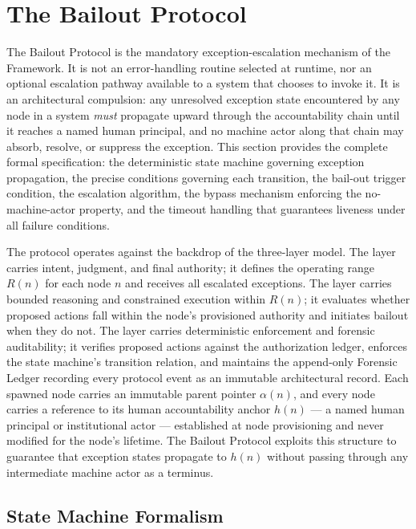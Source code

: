\section{The Bailout Protocol}\label{sec:bailout}

The Bailout Protocol is the mandatory exception-escalation mechanism of the \bxthree{} Framework. It is not an error-handling routine selected at runtime, nor an optional escalation pathway available to a system that chooses to invoke it. It is an architectural compulsion: any unresolved exception state encountered by any node in a \bxthree{} system \emph{must} propagate upward through the accountability chain until it reaches a named human principal, and no machine actor along that chain may absorb, resolve, or suppress the exception. This section provides the complete formal specification: the deterministic state machine governing exception propagation, the precise conditions governing each transition, the bail-out trigger condition, the escalation algorithm, the bypass mechanism enforcing the no-machine-actor property, and the timeout handling that guarantees liveness under all failure conditions.

The protocol operates against the backdrop of the \bxthree{} three-layer model. The \purpose{} layer carries intent, judgment, and final authority; it defines the operating range $R(n)$ for each node $n$ and receives all escalated exceptions. The \bounds{} layer carries bounded reasoning and constrained execution within $R(n)$; it evaluates whether proposed actions fall within the node's provisioned authority and initiates bailout when they do not. The \fact{} layer carries deterministic enforcement and forensic auditability; it verifies proposed actions against the authorization ledger, enforces the state machine's transition relation, and maintains the append-only Forensic Ledger recording every protocol event as an immutable architectural record. Each spawned node carries an immutable parent pointer $\alpha(n)$, and every node carries a reference to its human accountability anchor $h(n)$ --- a named human principal or institutional actor --- established at node provisioning and never modified for the node's lifetime. The Bailout Protocol exploits this structure to guarantee that exception states propagate to $h(n)$ without passing through any intermediate machine actor as a terminus.

\subsection{State Machine Formalism}\label{sec:state-machine}

